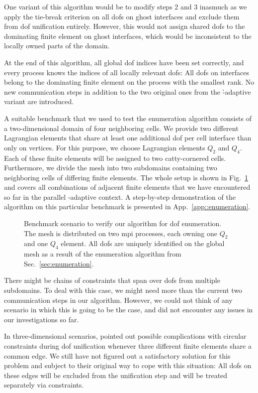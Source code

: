 One variant of this algorithm would be to modify steps 2 and 3 inasmuch as we apply the tie-break criterion on all \glspl{dof} on ghost interfaces and exclude them from \gls{dof} unification entirely. However, this would not assign shared \glspl{dof} to the dominating finite element on ghost interfaces, which would be inconsistent to the locally owned parts of the domain.

At the end of this algorithm, all global \gls{dof} indices have been set correctly, and every process knows the indices of all locally relevant \glspl{dof}: All \glspl{dof} on interfaces belong to the dominating finite element on the process with the smallest rank. No new communication steps in addition to the two original ones from the \h-adaptive variant are introduced.

A suitable benchmark that we used to test the enumeration algorithm consists of a two-dimensional domain of four neighboring cells. We provide two different Lagrangian elements that share at least one additional \gls{dof} per cell interface than only on vertices. For this purpose, we choose Lagrangian elements $Q_2$ and $Q_4$. Each of these finite elements will be assigned to two catty-cornered cells. Furthermore, we divide the mesh into two subdomains containing two neighboring cells of differing finite elements. The whole setup is shown in Fig.~\ref{fig:enumbenchmark} and covers all combinations of adjacent finite elements that we have encountered so far in the parallel \hp-adaptive context. A step-by-step demonstration of the algorithm on this particular benchmark is presented in App.~\ref{app::enumeration}.

\begin{figure}
\centering


\caption[Benchmark scenario for \gls{dof} enumeration.]{Benchmark scenario to verify our algorithm for \gls{dof} enumeration. The mesh is distributed on two \gls{mpi} processes, each owning one $Q_2$ and one $Q_4$ element. All \glspl{dof} are uniquely identified on the global mesh as a result of the enumeration algorithm from Sec.~\ref{sec:enumeration}.}
\label{fig:enumbenchmark}
\end{figure}

There might be chains of constraints that span over \glspl{dof} from multiple subdomains. To deal with this case, we might need more than the current two communication steps in our algorithm. However, we could not think of any scenario in which this is going to be the case, and did not encounter any issues in our investigations so far.

In three-dimensional scenarios, \textcite[Sec.~4.6]{bangerth2009} pointed out possible complications with circular constraints during \gls{dof} unification whenever three different finite elements share a common edge. We still have not figured out a satisfactory solution for this problem and subject to their original way to cope with this situation: All \glspl{dof} on these edges will be excluded from the unification step and will be treated separately via constraints.